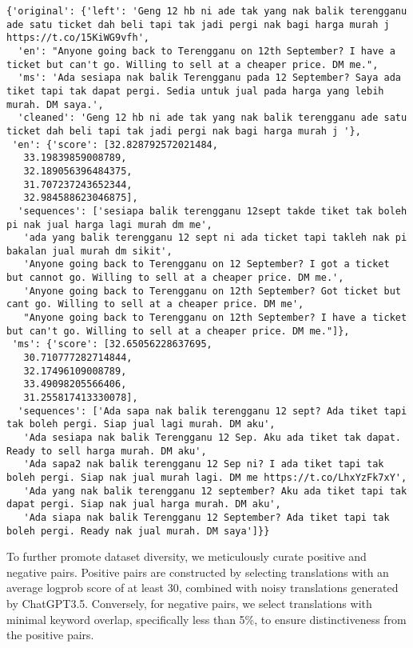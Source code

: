 \documentclass[preprint]{article}
\begin{document}
\begin{lstlisting}[breaklines=true]
  {'original': {'left': 'Geng 12 hb ni ade tak yang nak balik terengganu ade satu ticket dah beli tapi tak jadi pergi nak bagi harga murah j https://t.co/15KiWG9vfh',
  'en': "Anyone going back to Terengganu on 12th September? I have a ticket but can't go. Willing to sell at a cheaper price. DM me.",
  'ms': 'Ada sesiapa nak balik Terengganu pada 12 September? Saya ada tiket tapi tak dapat pergi. Sedia untuk jual pada harga yang lebih murah. DM saya.',
  'cleaned': 'Geng 12 hb ni ade tak yang nak balik terengganu ade satu ticket dah beli tapi tak jadi pergi nak bagi harga murah j '},
 'en': {'score': [32.828792572021484,
   33.19839859008789,
   32.189056396484375,
   31.707237243652344,
   32.984588623046875],
  'sequences': ['sesiapa balik terengganu 12sept takde tiket tak boleh pi nak jual harga lagi murah dm me',
   'ada yang balik terengganu 12 sept ni ada ticket tapi takleh nak pi bakalan jual murah dm sikit',
   'Anyone going back to Terengganu on 12 September? I got a ticket but cannot go. Willing to sell at a cheaper price. DM me.',
   'Anyone going back to Terengganu on 12th September? Got ticket but cant go. Willing to sell at a cheaper price. DM me',
   "Anyone going back to Terengganu on 12th September? I have a ticket but can't go. Willing to sell at a cheaper price. DM me."]},
 'ms': {'score': [32.65056228637695,
   30.710777282714844,
   32.17496109008789,
   33.49098205566406,
   31.255817413330078],
  'sequences': ['Ada sapa nak balik terengganu 12 sept? Ada tiket tapi tak boleh pergi. Siap jual lagi murah. DM aku',
   'Ada sesiapa nak balik Terengganu 12 Sep. Aku ada tiket tak dapat. Ready to sell harga murah. DM aku',
   'Ada sapa2 nak balik terengganu 12 Sep ni? I ada tiket tapi tak boleh pergi. Siap nak jual murah lagi. DM me https://t.co/LhxYzFk7xY',
   'Ada yang nak balik terengganu 12 september? Aku ada tiket tapi tak dapat pergi. Siap nak jual harga murah. DM aku',
   'Ada siapa nak balik Terengganu 12 September? Ada tiket tapi tak boleh pergi. Ready nak jual murah. DM saya']}}
\end{lstlisting}

To further promote dataset diversity, we meticulously curate positive and negative pairs. Positive pairs are constructed by selecting translations with an average logprob score of at least 30, combined with noisy translations generated by ChatGPT3.5. Conversely, for negative pairs, we select translations with minimal keyword overlap, specifically less than 5\%, to ensure distinctiveness from the positive pairs.
\end{document}
